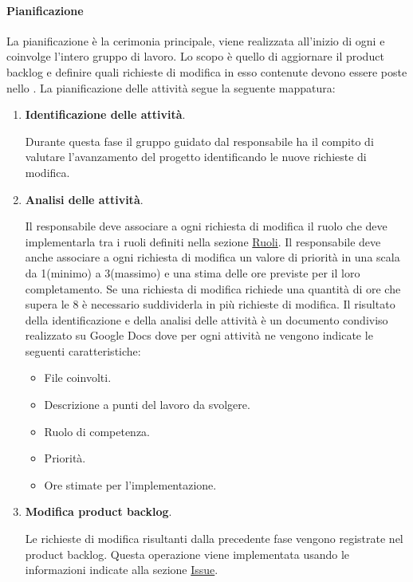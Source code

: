 \paragraph{Pianificazione}
La pianificazione è la cerimonia principale, viene realizzata all’inizio di ogni  e coinvolge l'intero gruppo di lavoro.
Lo scopo è quello di aggiornare il product backlog e definire quali richieste di modifica in esso contenute devono essere poste nello .
La pianificazione delle attività segue la seguente mappatura:
\begin{enumerate}
    \item \textbf{Identificazione delle attività}.
    
    Durante questa fase il gruppo guidato dal responsabile ha il compito di valutare l’avanzamento del progetto identificando le nuove richieste di modifica.

    \item \textbf{Analisi delle attività}.
    
    Il responsabile deve associare a ogni richiesta di modifica il ruolo che deve implementarla tra i ruoli definiti nella sezione \hyperref[subsubsec:ruoli]{Ruoli}.
    Il responsabile deve anche associare a ogni richiesta di modifica un valore di priorità in una scala da 1(minimo) a 3(massimo) e una stima delle ore previste per il loro completamento.
    Se una richiesta di modifica richiede una quantità di ore che supera le 8 è necessario suddividerla in più richieste di modifica.
    Il risultato della identificazione e della analisi delle attività è un documento condiviso realizzato su Google Docs dove per ogni attività ne vengono indicate le seguenti caratteristiche:
    \begin{itemize}
        \item File coinvolti.
        \item Descrizione a punti del lavoro da svolgere.
        \item Ruolo di competenza.
        \item Priorità.
        \item Ore stimate per l'implementazione.
    \end{itemize}

    \item \textbf{Modifica product backlog}.
    
    Le richieste di modifica risultanti dalla precedente fase vengono registrate nel product backlog.
    Questa operazione viene implementata usando le informazioni indicate alla sezione \hyperref[subpar:ITS]{Issue}.


\end{enumerate}

